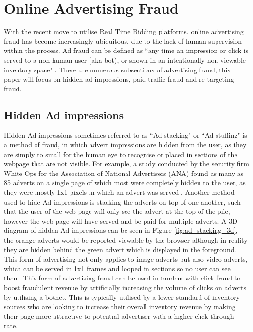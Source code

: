 \documentclass[12pt]{article}
\begin{document}
\pagebreak

\section{Online Advertising Fraud} \label{adFraud}
With the recent move to utilise Real Time Bidding platforms, online advertising fraud has become increasingly ubiquitous, due to the lack of human supervision within the process. Ad fraud can be defined as ``any time an impression or click is served to a non-human user (aka bot), or shown in an intentionally non-viewable inventory space" \parencite{dstillery}. There are numerous subsections of advertising fraud, this paper will focus on hidden ad impressions, paid traffic fraud and re-targeting fraud.   


\subsection{Hidden Ad impressions}
Hidden Ad impressions sometimes referred to as ``Ad stacking" or ``Ad stuffing" is a method of fraud, in which advert impressions are hidden from the user, as they are simply to small for the human eye to recognise or placed in sections of the webpage that are not visible. For example, a study conducted by the security firm White Ops for the Association of National Advertisers (ANA) found as many as 85 adverts on a single page of which most were completely hidden to the user, as they were mostly 1x1 pixels in which an advert was served \parencite{botfraud2015}. Another method used to hide Ad impressions is stacking the adverts on top of one another, such that the user of the web page will only see the advert at the top of the pile, however the web page will have served and be paid for multiple adverts. A 3D diagram of hidden Ad impressions can be seen in Figure \ref{fig:ad_stacking_3d}, the orange adverts would be reported viewable by the browser although in reality they are hidden behind the green advert which is displayed in the foreground.  \\

This form of advertising not only applies to image adverts but also video adverts, which can be served in 1x1 frames and looped in sections so no user can see them. This form of advertising fraud can be used in tandem with click fraud to boost fraudulent revenue by artificially increasing the volume of clicks on adverts by utilising a botnet. This is typically utilised by a lower standard of inventory sources who are looking to increase their overall inventory revenue by making their page more attractive to potential advertiser with a higher click through rate.   \\
\end{document}
